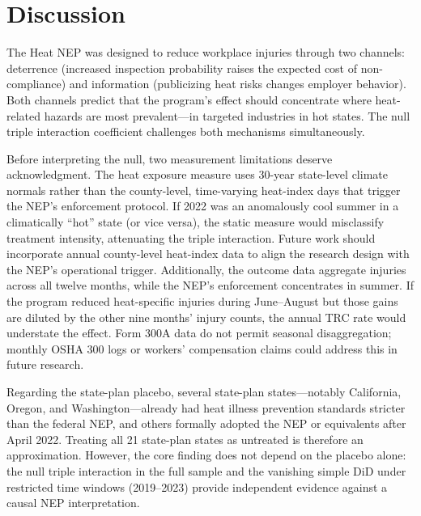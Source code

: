 \documentclass[12pt]{article}
\begin{document}
\section{Discussion}

The Heat NEP was designed to reduce workplace injuries through two channels: deterrence (increased inspection probability raises the expected cost of non-compliance) and information (publicizing heat risks changes employer behavior). Both channels predict that the program's effect should concentrate where heat-related hazards are most prevalent---in targeted industries in hot states. The null triple interaction coefficient challenges both mechanisms simultaneously.

Before interpreting the null, two measurement limitations deserve acknowledgment. The heat exposure measure uses 30-year state-level climate normals rather than the county-level, time-varying heat-index days that trigger the NEP's enforcement protocol. If 2022 was an anomalously cool summer in a climatically ``hot'' state (or vice versa), the static measure would misclassify treatment intensity, attenuating the triple interaction. Future work should incorporate annual county-level heat-index data to align the research design with the NEP's operational trigger. Additionally, the outcome data aggregate injuries across all twelve months, while the NEP's enforcement concentrates in summer. If the program reduced heat-specific injuries during June--August but those gains are diluted by the other nine months' injury counts, the annual TRC rate would understate the effect. Form 300A data do not permit seasonal disaggregation; monthly OSHA 300 logs or workers' compensation claims could address this in future research.

Regarding the state-plan placebo, several state-plan states---notably California, Oregon, and Washington---already had heat illness prevention standards stricter than the federal NEP, and others formally adopted the NEP or equivalents after April 2022. Treating all 21 state-plan states as untreated is therefore an approximation. However, the core finding does not depend on the placebo alone: the null triple interaction in the full sample and the vanishing simple DiD under restricted time windows (2019--2023) provide independent evidence against a causal NEP interpretation.
\end{document}
